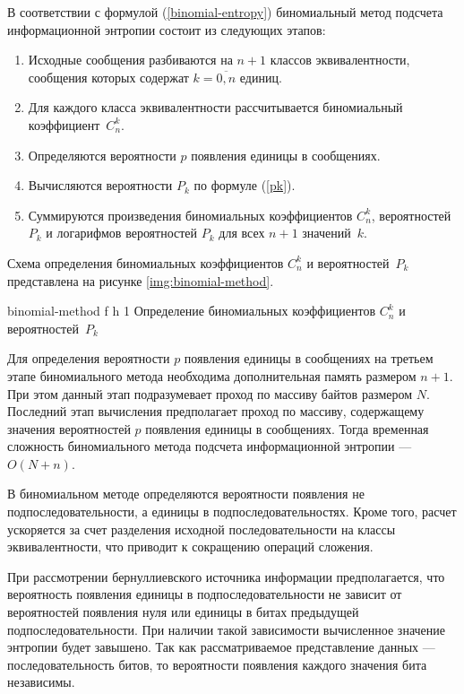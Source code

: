 В соответствии с формулой (\ref{binomial-entropy}) биномиальный метод подсчета информационной энтропии состоит из следующих этапов:

\begin{enumerate}
	\item Исходные сообщения разбиваются на $n + 1$ классов эквивалентности, сообщения которых содержат $k = \overline{0, n}$ единиц.
	\item Для каждого класса эквивалентности рассчитывается биномиальный коэффициент~$C_{n}^k$.
	\item Определяются вероятности $p$ появления единицы в сообщениях.
	\item Вычисляются вероятности $P_{k}$ по формуле (\ref{pk}).
	\item Суммируются произведения биномиальных коэффициентов $C_{n}^k$, вероятностей $P_{k}$ и логарифмов вероятностей $P_{k}$ для всех $n + 1$ значений~$k$.
\end{enumerate}

Схема определения биномиальных коэффициентов $C_{n}^k$ и вероятностей~$P_{k}$ представлена на рисунке \ref{img:binomial-method}.

    {binomial-method}
    {f}
    {h}
    {1\textwidth}
    {Определение биномиальных коэффициентов $C_{n}^k$ и вероятностей~$P_{k}$}

Для определения вероятности $p$ появления единицы в сообщениях на третьем этапе биномиального метода необходима дополнительная память размером $n + 1$. При этом данный этап подразумевает проход по массиву байтов размером $N$. Последний этап вычисления предполагает проход по массиву, содержащему значения вероятностей $p$ появления единицы в сообщениях. Тогда временная сложность биномиального метода подсчета информационной энтропии --- $O(N + n)$.

В биномиальном методе определяются вероятности появления не подпоследовательности, а единицы в подпоследовательностях. Кроме того, расчет ускоряется за счет разделения исходной последовательности на классы эквивалентности, что приводит к сокращению операций сложения.

При рассмотрении бернуллиевского источника информации предполагается, что вероятность появления единицы в подпоследовательности не зависит от вероятностей появления нуля или единицы в битах предыдущей подпоследовательности. При наличии такой зависимости вычисленное значение энтропии будет завышено. Так как рассматриваемое представление данных --- последовательность битов, то вероятности появления каждого значения бита независимы. 

